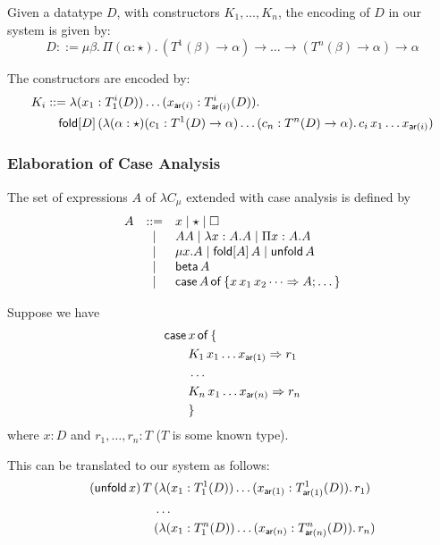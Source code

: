 Given a datatype $D$, with constructors $K_{1},\dots,K_{n}$, the
encoding of $D$ in our system is given by:
\[
  D ::= \mu \beta.\,\Pi(\alpha : \star).\,(T^{1}(\beta) \rightarrow
  \alpha) \rightarrow \dots \rightarrow (T^{n}(\beta) \rightarrow
  \alpha) \rightarrow \alpha
\]

The constructors are encoded by:
\begin{align*}
  K_{i} &::= \lambda(x_{1}:T_{1}^{i}(D))\dots(x_{\mathsf{ar}(i)}:T_{\mathsf{ar}(i)}^{i}(D)).\\
        &\quad \fold{D}{(\lambda(\alpha:\star)(c_{1}:T^{1}(D) \rightarrow \alpha)\dots(c_{n}:T^{n}(D) \rightarrow \alpha).\,c_{i}\,x_{1} \dots x_{\mathsf{ar}(i)})}
\end{align*}

\subsubsection{Elaboration of Case Analysis}

The set of expressions $A$ of $\lambda C_{\mu}$ extended with case
analysis is defined by
\[
  \renewcommand*{\arraystretch}{1.0}%
  \begin{array}{lcl}
    A &::= & x \mid \star \mid \square \\
      & \mid & AA \mid \lambda x:A.A \mid \Pi x:A.A \\
      & \mid & \mu x.A \mid \fold{A}{A} \mid \unfold[A]{A} \\
      & \mid & \bet{A} \\
      & \mid & \case \,A\,\of\,\{x\,x_{1}\,x_{2} \dots \Rightarrow A; \dots\}
  \end{array}
\]

Suppose we have
\begin{align*}
  \case\,&x\,\of\,\{\\
         &K_{1}\,x_{1}\dots x_{\mathsf{ar}(1)} \Rightarrow r_{1}\\
         &\dots\\
         &K_{n}\,x_{1}\dots x_{\mathsf{ar}(n)} \Rightarrow r_{n}\\
         &\}
\end{align*}
where $x : D$ and $r_{1},\dots,r_{n} : T$ ($T$ is some known type).

This can be translated to our system as follows:
\begin{align*}
  (\unfold[D]{x})\,T\,&(\lambda(x_{1}:T_{1}^{1}(D))\dots(x_{\mathsf{ar}(1)}:T_{\mathsf{ar}(1)}^{1}(D)).\,r_{1})\\
                      &\dots\\
                      &(\lambda(x_{1}:T_{1}^{n}(D))\dots(x_{\mathsf{ar}(n)}:T_{\mathsf{ar}(n)}^{n}(D)).\,r_{n})
\end{align*}
